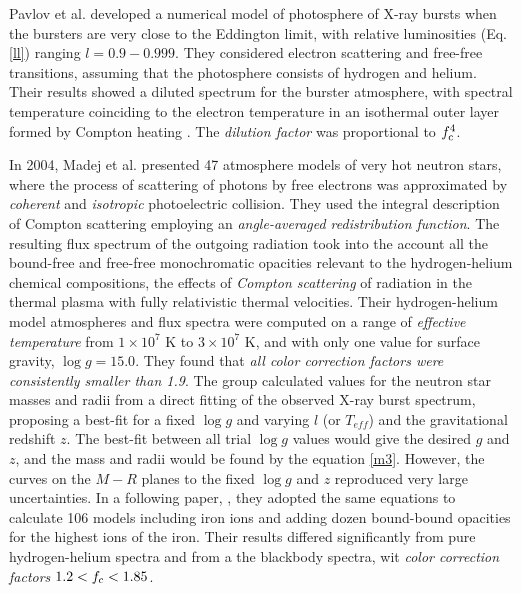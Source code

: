{\quad

Pavlov et al. \cite{PAV91} developed a numerical model of photosphere of X-ray bursts when the bursters are very close to the Eddington limit, with relative luminosities (Eq. \ref{ll}) ranging $l = 0.9-0.999$. They considered electron scattering and free-free transitions, assuming that the photosphere consists of hydrogen and helium. Their results showed a diluted spectrum for the burster atmosphere,  with spectral temperature coinciding to the electron temperature in an isothermal outer layer formed by Compton heating .  The  {\it dilution factor} was proportional to $f_{\rm c}^4$. 


\quad

In 2004, Madej et al. \cite{MAD04} presented 47 atmosphere models of  very hot neutron stars, where the  process of scattering of photons by free electrons was approximated by {\it coherent} and {\it isotropic} photoelectric collision. They used the integral description of Compton scattering employing an {\it angle-averaged redistribution function}.  The resulting flux spectrum of the outgoing radiation took into the account all the bound-free and  free-free monochromatic opacities relevant to the hydrogen-helium chemical compositions, \ie the effects of {\it Compton scattering} of radiation in the thermal plasma with fully relativistic thermal velocities. Their  hydrogen-helium model atmospheres and flux spectra were computed on a range of {\it effective temperature} from  $1 \times 10^7$ K to $3 \times 10^7$ K, and with only one value for surface gravity, $\log g = 15.0$. They found that {\it all color correction factors were consistently smaller than 1.9}. The group calculated values for the neutron star masses and radii from a direct fitting of the observed X-ray burst spectrum, proposing a best-fit for a fixed $\log g$ and  varying  $l$ (or $T_{eff}$) and the gravitational redshift $z$. The best-fit between all trial $\log g$ values would give the desired $g$ and $z$, and the mass and radii would be found by the equation \ref{m3}. However,  the curves on the $M-R$ planes to the fixed $\log g$ and $z$ reproduced very large uncertainties. In a following paper, \cite{MAJ05}, they adopted the same equations to calculate 106 models including  iron ions and adding  dozen bound-bound opacities for the highest ions of the iron. Their results differed significantly from pure hydrogen-helium spectra and from a the blackbody spectra, wit {\it color correction factors  $1.2<f_{\rm c} <1.85$}.


\quad

}
